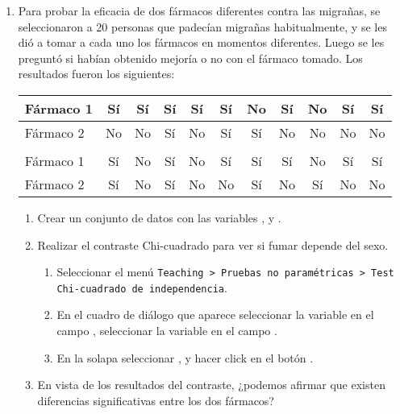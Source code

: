 \begin{enumerate}[leftmargin=*]
\item Para probar la eficacia de dos fármacos diferentes contra las migrañas, se seleccionaron a 20 personas que
padecían migrañas habitualmente, y se les dió a tomar a cada uno los fármacos en momentos diferentes. Luego se les
preguntó si habían obtenido mejoría o no con el fármaco tomado. Los resultados fueron los siguientes:
\begin{center}
\begin{tabular}{lcccccccccc}
\hline
Fármaco 1 & Sí & Sí & Sí & Sí& Sí & No & Sí & No& Sí & Sí  \\
\hline
Fármaco 2 & No & No & Sí & No & Sí & Sí & No & No& No & No \\
\hline\\
\hline
Fármaco 1 & Sí & No& Sí & No & Sí & Sí& Sí & No & Sí & Sí \\
\hline
Fármaco 2 & Sí & No& Sí & No & No & Sí& No & Sí & No & No\\
\hline
\end{tabular}
\end{center}

\begin{enumerate}
\item Crear un conjunto de datos con las variables , y .

\item Realizar el contraste Chi-cuadrado para ver si fumar depende del sexo.  
\begin{indicacion}
\begin{enumerate}
\item Seleccionar el menú \texttt{Teaching > Pruebas no paramétricas > Test Chi-cuadrado de independencia}.
\item En el cuadro de diálogo que aparece seleccionar la variable  en el campo , seleccionar la variable  en el campo .
\item En la solapa  seleccionar , y hacer click en el
botón .
\end{enumerate}
\end{indicacion}


\item En vista de los resultados del contraste, ¿podemos afirmar que existen diferencias significativas entre los dos
fármacos?
\end{enumerate}

\end{enumerate}



